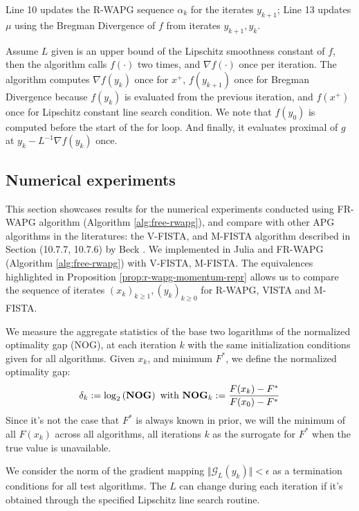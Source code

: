 \documentclass[12pt]{article}
\begin{document}
    Line 10 updates the R-WAPG sequence $\alpha_k$ for the iterates $y_{k + 1}$;
    Line 13 updates $\mu$ using the Bregman Divergence of $f$ from iterates $y_{k + 1}, y_k$. 
    \par
    Assume $L$ given is an upper bound of the Lipschitz smoothness constant of $f$, then the algorithm calls $f(\cdot)$ two times, and $\nabla f(\cdot)$ once per iteration. 
    The algorithm computes $\nabla f(y_k)$ once for $x^+$, $f(y_{k + 1})$ once for Bregman Divergence because $f(y_{k})$ is evaluated from the previous iteration, and $f(x^+)$ once for Lipschitz constant line search condition. 
    We note that $f(y_0)$ is computed before the start of the for loop. 
    And finally, it evaluates proximal of $g$ at $y_k - L^{-1}\nabla f(y_k)$ once. 

    \subsection{Numerical experiments}
        This section showcases results for the numerical experiments conducted using FR-WAPG algorithm (Algorithm \ref{alg:free-rwapg}), and compare with other APG algorithms in the literatures: the V-FISTA, and M-FISTA algorithm described in Section (10.7.7, 10.7.6) by Beck \cite{beck_first-order_2017}. 
        We implemented in Julia \cite{bezanson_julia_2017} and FR-WAPG (Algorithm \ref{alg:free-rwapg}) with V-FISTA, M-FISTA. 
        The equivalences highlighted in Proposition \ref{prop:r-wapg-momentum-repr} allows us to compare the sequence of iterates $(x_k)_{k \ge 1}, (y_k)_{k \ge0}$ for R-WAPG, VISTA and M-FISTA. 
        \par
        We measure the aggregate statistics of the base two logarithms of the normalized optimality gap (NOG), at each iteration $k$ with the same initialization conditions given for all algorithms.
        Given $x_k$, and minimum $F^*$, we define the normalized optimality gap: 
        \newcommand{\NOG}{\text{\textbf{NOG}}}
        \begin{align*}
            \delta_k := \log_2\left(
                \NOG
            \right)
            \text{ with } 
            \NOG_k := \frac{F(x_k) - F^*}{F(x_0) - F^*}
        \end{align*}
        Since it's not the case that $F^*$ is always known in prior, we will the minimum of all $F(x_k)$ across all algorithms, all iterations $k$ as the surrogate for $F^*$ when the true value is unavailable. 
        \par 
        We consider the norm of the gradient mapping $\Vert \mathcal G_L(y_k)\Vert < \epsilon$ as a termination conditions for all test algorithms. 
        The $L$ can change during each iteration if it's obtained through the specified Lipschitz line search routine. 
\end{document}
